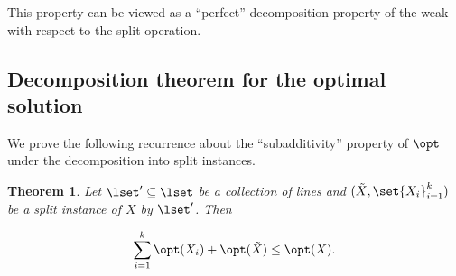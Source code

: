 \documentclass[11pt]{article}
\numberwithin{equation}{section}
\newtheorem{theorem}{Theorem}[section]
\theoremstyle{definition}
\theoremstyle{plain}
\begin{document}
This property can be viewed as a ``perfect'' decomposition property of the weak \WBone with respect to the split operation. 
%







\subsection{Decomposition theorem for the optimal solution}
\label{sec:decompose opt}  

We prove the following recurrence about the ``subadditivity'' property of $\opt$ under the decomposition into split instances. 
%

\begin{theorem}
        \label{thm: opt decomposes} 
Let $\lset' \subseteq \lset$ be a collection of lines and $(\tilde{X}, \set{X_i}_{i=1}^k)$ be a split instance of $X$ by $\lset'$. Then 
%
        
         $$\sum_{i =1}^k\opt(X_i) + \opt(\tilde{X}) \leq \opt(X).$$
\end{theorem}
\end{document}
